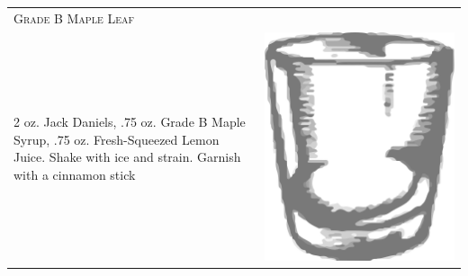 \documentclass{article}
\begin{document}
\begin{tabular}{p{2in} p{0.5in}}
\multicolumn{2}{p{3in}}{\centering\Huge\textsc{Grade B Maple Leaf}} \\ 
  \vspace{-0.1in}2 oz. Jack Daniels, .75 oz. Grade B Maple Syrup, .75 oz. Fresh-Squeezed Lemon Juice. Shake with ice and strain.  Garnish with a cinnamon stick &
  \vspace{-0.1in} \includegraphics{rocks_glass.png}
\end{tabular}
\end{document}
